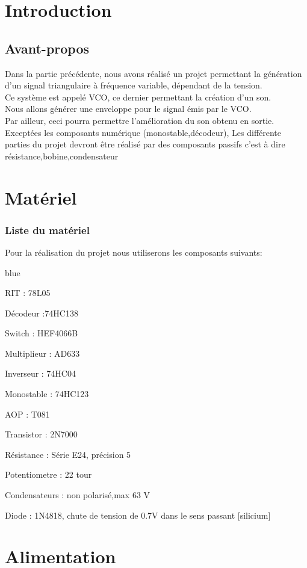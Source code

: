 {\chapter{Introduction}

\section{Avant-propos}

Dans la partie précédente, nous avons réalisé un projet permettant la génération d’un signal triangulaire à fréquence variable, dépendant de la tension. \\

Ce système est appelé VCO, ce dernier permettant la création d’un son. \\

Nous allons générer une enveloppe pour le signal émis par le VCO.\\ 
Par ailleur, ceci pourra permettre l'amélioration du son obtenu en sortie. \\
Exceptées les composants numérique (monostable,décodeur), Les différente parties du projet devront être réalisé par des composants passifs c’est à dire 
résistance,bobine,condensateur
\chapter{Matériel}
\subsection{Liste du matériel}


Pour la réalisation du projet nous utiliserons les composants suivants:

\begin{items}{blue}{\Bullet}
    \item RIT : 78L05
    \item Décodeur :74HC138
    \item Switch : HEF4066B
    \item Multiplieur : AD633
    \item Inverseur : 74HC04
    \item Monostable : 74HC123
    \item AOP : T081
    \item Transistor : 2N7000
    \item Résistance : Série E24,  précision 5%
    \item Potentiometre : 22 tour
    \item Condensateurs : non polarisé,max 63 V 
    \item Diode : 1N4818, chute de tension de 0.7V dans le sens passant [silicium]
\end{items}\chapter{Alimentation}
}

